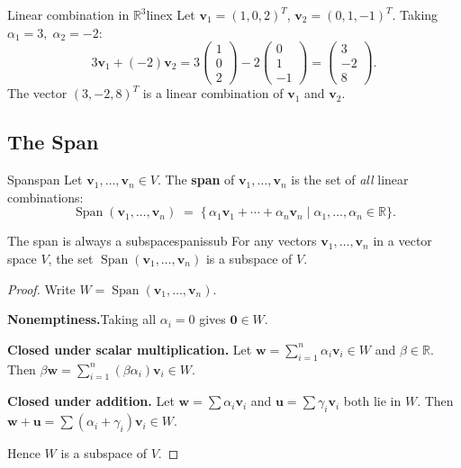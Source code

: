 \documentclass[12pt,a4paper]{article}
\newcommand{\R}{\mathbb{R}}
\newcommand{\vv}[1]{\mathbf{#1}}
\newcommand{\vzero}{\mathbf{0}}
\DeclareMathOperator{\Span}{Span}
\begin{document}
\begin{example}{Linear combination in $\R^3$}{linex}
  Let $\vv{v}_1 = (1,0,2)^T$, $\vv{v}_2 = (0,1,-1)^T$.
  Taking $\alpha_1 = 3,\; \alpha_2 = -2$:
  \[
    3\vv{v}_1 + (-2)\vv{v}_2
    = 3\begin{pmatrix}1\\0\\2\end{pmatrix}
    - 2\begin{pmatrix}0\\1\\-1\end{pmatrix}
    = \begin{pmatrix}3\\-2\\8\end{pmatrix}.
  \]
  The vector $(3,-2,8)^T$ is a linear combination of $\vv{v}_1$ and $\vv{v}_2$.
\end{example}

\subsection{The Span}

\begin{definition}{Span}{span}
  Let $\vv{v}_1, \ldots, \vv{v}_n \in V$.  The \textbf{span} of
  $\vv{v}_1, \ldots, \vv{v}_n$ is the set of \emph{all} linear combinations:
  \[
    \Span(\vv{v}_1, \ldots, \vv{v}_n)
    \;=\;
    \bigl\{\,
      \alpha_1\vv{v}_1 + \cdots + \alpha_n\vv{v}_n
      \;\big|\;
      \alpha_1, \ldots, \alpha_n \in \R
    \bigr\}.
  \]
\end{definition}

\begin{proposition}{The span is always a subspace}{spanissub}
  For any vectors $\vv{v}_1, \ldots, \vv{v}_n$ in a vector space $V$, the
  set $\Span(\vv{v}_1, \ldots, \vv{v}_n)$ is a subspace of $V$.
\end{proposition}

\begin{proof}
Write $W = \Span(\vv{v}_1, \ldots, \vv{v}_n)$.

\textbf{Nonemptiness.}\quad Taking all $\alpha_i = 0$ gives $\vzero \in W$.

\textbf{Closed under scalar multiplication.}\quad
Let $\vv{w} = \sum_{i=1}^n \alpha_i \vv{v}_i \in W$ and $\beta \in \R$.
Then $\beta\vv{w} = \sum_{i=1}^n (\beta\alpha_i)\vv{v}_i \in W$.

\textbf{Closed under addition.}\quad
Let $\vv{w} = \sum \alpha_i\vv{v}_i$ and $\vv{u} = \sum \gamma_i\vv{v}_i$
both lie in $W$.  Then
$\vv{w}+\vv{u} = \sum(\alpha_i+\gamma_i)\vv{v}_i \in W$.

Hence $W$ is a subspace of $V$.
\end{proof}
\end{document}
